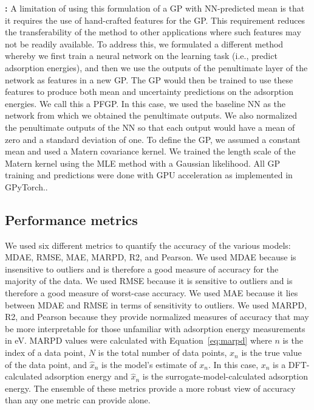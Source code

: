 \documentclass[]{achemso}
\begin{document}
\textbf{:}
A limitation of using this formulation of a \gls{GP} with \gls{NN}-predicted mean is that it requires the use of hand-crafted features for the \gls{GP}.
This requirement reduces the transferability of the method to other applications where such features may not be readily available.
To address this, we formulated a different method whereby we first train a neural network on the learning task (i.e., predict adsorption energies), and then we use the outputs of the penultimate layer of the network as features in a new \gls{GP}.
The \gls{GP} would then be trained to use these features to produce both mean and uncertainty predictions on the adsorption energies.
We call this a \gls{PFGP}.
In this case, we used the baseline \gls{NN} as the network from which we obtained the penultimate outputs.
We also normalized the penultimate outputs of the \gls{NN} so that each output would have a mean of zero and a standard deviation of one.
To define the \gls{GP}, we assumed a constant mean and used a Matern covariance kernel.
We trained the length scale of the Matern kernel using the \gls{MLE} method with a Gaussian likelihood.
All \gls{GP} training and predictions were done with GPU acceleration as implemented in GPyTorch.\cite{Gardner2018}.



\subsection{Performance metrics}

We used six different metrics to quantify the accuracy of the various models:  \gls{MDAE}, \gls{RMSE}, \gls{MAE}, \gls{MARPD}, \gls{R2}, and \gls{Pearson}.
We used \gls{MDAE} because is insensitive to outliers and is therefore a good measure of accuracy for the majority of the data.
We used \gls{RMSE} because it is sensitive to outliers and is therefore a good measure of worst-case accuracy.
We used \gls{MAE} because it lies between \gls{MDAE} and \gls{RMSE} in terms of sensitivity to outliers.
We used \gls{MARPD}, \gls{R2}, and \gls{Pearson} because they provide normalized measures of accuracy that may be more interpretable for those unfamiliar with adsorption energy measurements in \gls{eV}.
\gls{MARPD} values were calculated with Equation~\ref{eq:marpd} where $n$ is the index of a data point, $N$ is the total number of data points, $x_n$ is the true value of the data point, and $\hat{x}_n$ is the model's estimate of $x_n$.
In this case, $x_n$ is a DFT-calculated adsorption energy and $\hat{x}_n$ is the surrogate-model-calculated adsorption energy.
The ensemble of these metrics provide a more robust view of accuracy than any one metric can provide alone.
\end{document}
